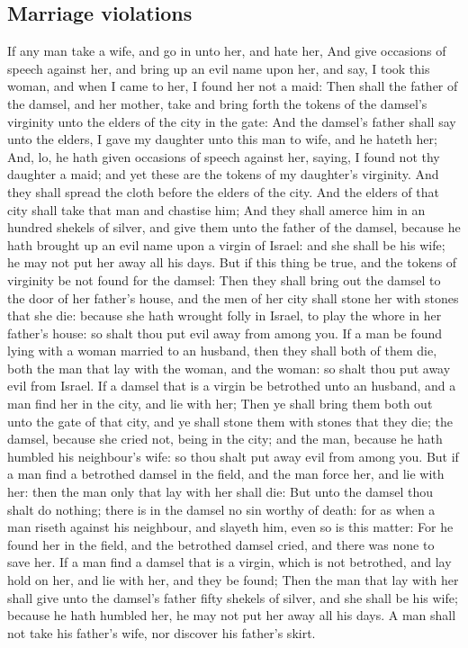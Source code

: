 \begin{biblechapter}
\section*{Marriage violations}
\verse If any man take a wife, and go in unto her, and hate her,
\verse And give occasions of speech against her, and bring up an evil name upon her, and say, I took this woman, and when I came to her, I found her not a maid:
\verse Then shall the father of the damsel, and her mother, take and bring forth the tokens of the damsel's virginity unto the elders of the city in the gate:
\verse And the damsel's father shall say unto the elders, I gave my daughter unto this man to wife, and he hateth her;
\verse And, lo, he hath given occasions of speech against her, saying, I found not thy daughter a maid; and yet these are the tokens of my daughter's virginity. And they shall spread the cloth before the elders of the city.
\verse And the elders of that city shall take that man and chastise him;
\verse And they shall amerce him in an hundred shekels of silver, and give them unto the father of the damsel, because he hath brought up an evil name upon a virgin of Israel: and she shall be his wife; he may not put her away all his days.
\verse But if this thing be true, and the tokens of virginity be not found for the damsel:
\verse Then they shall bring out the damsel to the door of her father's house, and the men of her city shall stone her with stones that she die: because she hath wrought folly in Israel, to play the whore in her father's house: so shalt thou put evil away from among you.
\verse If a man be found lying with a woman married to an husband, then they shall both of them die, both the man that lay with the woman, and the woman: so shalt thou put away evil from Israel.
\verse If a damsel that is a virgin be betrothed unto an husband, and a man find her in the city, and lie with her;
\verse Then ye shall bring them both out unto the gate of that city, and ye shall stone them with stones that they die; the damsel, because she cried not, being in the city; and the man, because he hath humbled his neighbour's wife: so thou shalt put away evil from among you.
\verse But if a man find a betrothed damsel in the field, and the man force her, and lie with her: then the man only that lay with her shall die:
\verse But unto the damsel thou shalt do nothing; there is in the damsel no sin worthy of death: for as when a man riseth against his neighbour, and slayeth him, even so is this matter:
\verse For he found her in the field, and the betrothed damsel cried, and there was none to save her.
\verse If a man find a damsel that is a virgin, which is not betrothed, and lay hold on her, and lie with her, and they be found;
\verse Then the man that lay with her shall give unto the damsel's father fifty shekels of silver, and she shall be his wife; because he hath humbled her, he may not put her away all his days.
\verse A man shall not take his father's wife, nor discover his father's skirt.
\end{biblechapter}

